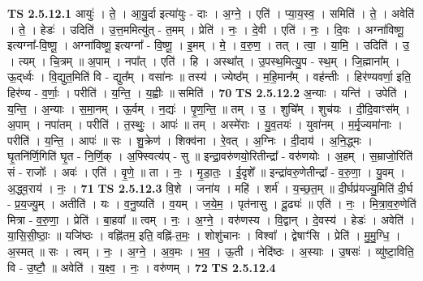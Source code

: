 \documentclass[17pt]{extarticle}
\begin{document}
                                \textbf{ TS 2.5.12.1} \newline
                  आयुः॑ । ते॒ । आ॒यु॒र्दा इत्या॑युः - दाः । अ॒ग्ने॒ । एति॑ । प्या॒य॒स्व॒ । समिति॑ । ते॒ । अवेति॑ । ते॒ । हेडः॑ । उदिति॑ । उ॒त्त॒ममित्यु॑त् - त॒मम् । प्रेति॑ । नः॒ । दे॒वी । एति॑ । नः॒ । दि॒वः । अग्ना॑विष्णू॒ इत्यग्ना᳚-वि॒ष्णू॒ । अग्ना॑विष्णू॒ इत्यग्ना᳚ - वि॒ष्णू॒ । इ॒मम् । मे॒ । व॒रु॒ण॒ । तत् । त्वा॒ । या॒मि॒ । उदिति॑ । उ॒ । त्यम् । चि॒त्रम् ॥ अ॒पाम् । नपा᳚त् । एति॑ । हि । अस्था᳚त् । उ॒पस्थ॒मित्यु॒प - स्थ॒म् । जि॒ह्माना᳚म् । ऊ॒द्‌र्ध्वः । वि॒द्युत॒मिति॑ वि - द्युत᳚म् । वसा॑नः ॥ तस्य॑ । ज्येष्ठ᳚म् । म॒हि॒मान᳚म् । वह॑न्तीः । हिर॑ण्यवर्णा॒ इति॒ हिर॑ण्य - व॒र्णाः॒ । परीति॑ । य॒न्ति॒ । य॒ह्वीः ॥ समिति॑ । \textbf{  70} \newline
                  \newline
                                \textbf{ TS 2.5.12.2} \newline
                  अ॒न्याः । यन्ति॑ । उपेति॑ । य॒न्ति॒ । अ॒न्याः । स॒मा॒नम् । ऊ॒र्वम् । न॒द्यः॑ । पृ॒ण॒न्ति॒ ॥ तम् । उ॒ । शुचि᳚म् । शुच॑यः । दी॒दि॒वाꣳस᳚म् । अ॒पाम् । नपा॑तम् । परीति॑ । त॒स्थुः॒ । आपः॑ ॥ तम् । अस्मे॑राः । यु॒व॒तयः॑ । युवा॑नम् । म॒र्मृ॒ज्यमा॑नाः । परीति॑ । य॒न्ति॒ । आपः॑ ॥ सः । शु॒क्रेण॑ । शिक्व॑ना । रे॒वत् । अ॒ग्निः । दी॒दाय॑ । अ॒नि॒द्ध्मः । घृ॒तनि॑र्णि॒गिति॑ घृ॒त - नि॒र्णि॒क् । अ॒फ्स्वित्य॑प् - सु ॥ इन्द्रा॒वरु॑णयो॒रितीन्द्रा᳚ - वरु॑णयोः । अ॒हम् । स॒म्राजो॒रिति॑ सं - राजोः᳚ । अवः॑ । एति॑ । वृ॒णे॒ ॥ ता । नः॒ । मृ॒डा॒तः॒ । ई॒दृशे᳚ ॥ इन्द्रा॑वरु॒णेतीन्द्रा᳚ - व॒रु॒णा॒ । यु॒वम् । अ॒द्ध्व॒राय॑ । नः॒ । \textbf{  71} \newline
                  \newline
                                \textbf{ TS 2.5.12.3} \newline
                  वि॒शे । जना॑य । महि॑ । शर्म॑ । य॒च्छ॒त॒म् ॥ दी॒र्घप्र॑यज्यु॒मिति॑ दी॒र्घ - प्र॒य॒ज्यु॒म् । अतीति॑ । यः । व॒नु॒ष्यति॑ । व॒यम् । ज॒ये॒म॒ । पृत॑नासु । दू॒ढ्यः॑ ॥ एति॑ । नः॒ । मि॒त्रा॒व॒रु॒णेति॑ मित्रा - व॒रु॒णा॒ । प्रेति॑ । बा॒हवा᳚ ॥ त्वम् । नः॒ । अ॒ग्ने॒ । वरु॑णस्य । वि॒द्वान् । दे॒वस्य॑ । हेडः॑ । अवेति॑ । या॒सि॒सी॒ष्ठाः॒ ॥ यजि॑ष्ठः । वह्नि॑तम॒ इति॒ वह्नि॑-त॒मः॒ । शोशु॑चानः । विश्वा᳚ । द्वेषाꣳ॑सि । प्रेति॑ । मु॒मु॒ग्धि॒ । अ॒स्मत् ॥ सः । त्वम् । नः॒ । अ॒ग्ने॒ । अ॒व॒मः । भ॒व॒ । ऊ॒ती । नेदि॑ष्ठः । अ॒स्याः । उ॒षसः॑ । व्यु॑ष्टा॒विति॒ वि - उ॒ष्टौ॒ ॥ अवेति॑ । य॒क्ष्व॒ । नः॒ । वरु॑णम् । \textbf{  72} \newline
                  \newline
                                \textbf{ TS 2.5.12.4} \newline
\end{document}
